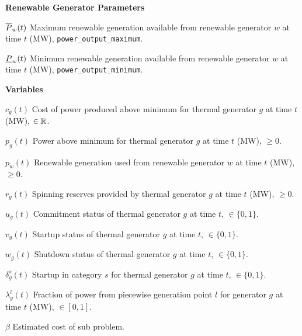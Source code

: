 \documentclass[a4paper,12pt]{article}
\begin{document}
\textbf{Renewable Generator Parameters}
\begin{IEEEdescription}[\mydescriptionopt]
	\item[$\overline{P}_w(t)$] Maximum renewable generation available from renewable generator $w$ at time $t$ (MW), {\tt power\_output\_maximum}.
	\item[$\underline{P}_w(t)$] Minimum renewable generation available from renewable generator $w$ at time $t$ (MW), {\tt power\_output\_minimum}.
\end{IEEEdescription}


\textbf{Variables}
\begin{IEEEdescription}[\mydescriptionopt]
	\item[$c_g(t)$]    Cost of power produced above minimum for thermal generator $g$ at time $t$ (MW), $\in {\mathbb R}$.
	\item[$p_g(t)$]    Power above minimum for thermal generator $g$ at time $t$ (MW), $\geq 0$.
	\item[$p_w(t)$]  Renewable generation used from renewable generator $w$ at time $t$ (MW), $\geq 0$.
	\item[$r_g(t)$]    Spinning reserves provided by thermal generator $g$ at time $t$ (MW), $\geq 0$.
	\item[$u_g(t)$]    Commitment status of thermal generator $g$ at time $t$, $\in \{0,1\}$. 
	\item[$v_g(t)$]    Startup status of thermal generator $g$ at time $t$, $\in \{0,1\}$. 
	\item[$w_g(t)$]    Shutdown status of thermal generator $g$ at time $t$, $\in \{0,1\}$. \
	\item[$\delta^s_g(t)$] Startup in category $s$ for thermal generator $g$ at time $t$, $\in \{0,1\}$.
	\item[$\lambda_g^l(t)$]  Fraction of power from piecewise generation point $l$ for generator $g$ at time $t$ (MW), $\in [0,1]$. \
        \item[$\beta$]    Estimated cost of sub problem.
\
\end{IEEEdescription}
\end{document}
